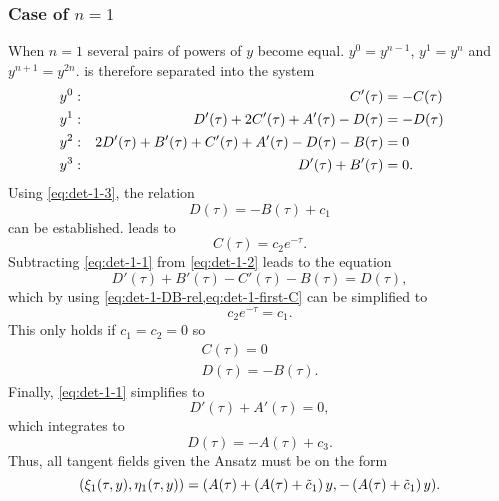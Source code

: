 \subsubsection{Case of \texorpdfstring{\(n=1\)}{n is 1}}

When \(n=1\) several pairs of powers of \(y\) become equal.
\(y^0 = y^{n-1}\), \(y^1 = y^n\) and \(y^{n+1} = y^{2n}\).
 is therefore separated into the system
\begin{subequations}
  \begin{flalign}
    y^0:  && C'(\tau) &= -C(\tau) &&\FlLabel{eq:det-1-0}\\
    y^1:  && D'(\tau) + 2C'(\tau) + A'(\tau) - D(\tau) &= -D(\tau) &&\FlLabel{eq:det-1-1}\\
    y^2:  && 2D'(\tau) + B'(\tau) + C'(\tau) + A'(\tau) - D(\tau) - B(\tau) &= 0 &&\FlLabel{eq:det-1-2}\\
    y^3:  && D'(\tau) + B'(\tau) &= 0. &&\FlLabel{eq:det-1-3}
  \end{flalign}
\end{subequations}
Using \cref{eq:det-1-3}, the relation
\begin{equation} \label{eq:det-1-DB-rel}
  D(\tau) = - B(\tau) + c_1
\end{equation}
can be established.
 leads to
\begin{equation} \label{eq:det-1-first-C}
  C(\tau) = c_2 e^{-\tau}.
\end{equation}
Subtracting \cref{eq:det-1-1} from \cref{eq:det-1-2} leads to the equation
\begin{equation}
  D'(\tau) + B'(\tau) - C'(\tau) - B(\tau) = D(\tau),
\end{equation}
which by using \cref{eq:det-1-DB-rel,eq:det-1-first-C} can be simplified to
\begin{equation}
  c_2 e^{-\tau} = c_1.
\end{equation}
This only holds if \(c_1 = c_2 = 0\) so
\begin{gather}
  C(\tau) = 0 \\
  D(\tau) = - B(\tau).
\end{gather}
Finally, \cref{eq:det-1-1} simplifies to
\begin{equation}
  D'(\tau) + A'(\tau) = 0,
\end{equation}
which integrates to
\begin{equation}
  D(\tau) = - A(\tau) + c_3.
\end{equation}
Thus, all tangent fields given the Ansatz must be on the form
\begin{equation} \label{eq:hill-tangent-field-1}
  \pqty{\xi_1(\tau,y),\eta_1(\tau,y)} = 
  \pqty{A(\tau) + \left( A(\tau) + \tilde{c}_1 \right) y, - \left( A(\tau) + \tilde{c}_1 \right) y}.
\end{equation}

